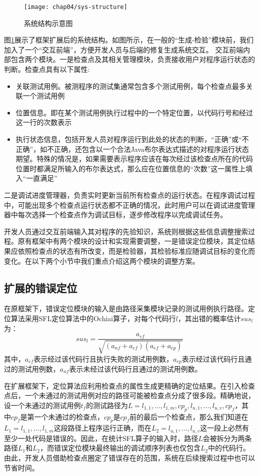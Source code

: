 \begin{figure}
	\centering
	\texttt{[image: chap04/sys-structure]}
	\caption{系统结构示意图}
	\label{fig:sys-structure}
\end{figure}

图\ref{fig:sys-structure}展示了框架扩展后的系统结构。如图所示，在一般的“生成-检验”模块前，我们加入了一个“交互前端”，方便开发人员与后端的修复生成系统交互。
交互前端内部包含两个模块。一是检查点及其相关管理模块，负责接收用户对程序运行状态的判断。检查点具有以下属性:
\begin{itemize}
	\item 关联测试用例。被测程序的测试集通常包含多个测试用例，每个检查点最多关联一个测试用例
	\item 位置信息。即在某个测试用例执行过程中的一个特定位置，以代码行号和经过这一行的次数表示
	\item 执行状态信息，包括开发人员对程序运行到此处的状态的判断，“正确”或“不正确”，如不正确，还包含以一个合法Java布尔表达式描述的对程序运行状态期望。特殊的情况是，如果需要表示程序应该在每次经过该检查点所在的代码位置时都满足所输入的布尔表达式，那么应在位置信息的“次数”这一属性上填入“一直满足”
\end{itemize}

二是调试进度管理器，负责实时更新当前所有检查点的运行状态。在程序调试过程中，可能出现多个检查点运行状态都不正确的情况，此时用户可以在调试进度管理器中每次选择一个检查点作为调试目标，逐步修改程序以完成调试任务。

开发人员通过交互前端输入其对程序的先验知识，系统则根据这些信息调整搜索过程。原有框架中有两个模块的设计和实现需要调整，一是错误定位模块，其定位结果应依照检查点的状态有所改变，而是检验器，其检验标准应随调试目标的变化而变化。在以下两个小节中我们重点介绍这两个模块的调整方案。


\subsection{扩展的错误定位}%

在原框架下，错误定位模块的输入是由路径采集模块记录的测试用例执行路径。定位算法采用SFL定位算法中的Ochiai\cite{Abreu:2006:ESC:1193217.1194368}算子，对每个代码行$l$，其出错的概率估计$sus_l$为：
$$sus_l = \frac{a_{ef}}{\sqrt{(a_{nf} + a_{ef}) (a_{ef} + a_{ep})}}$$
其中，$a_{ef}$表示经过该代码行且执行失败的测试用例数，$a_{ep}$表示经过该代码行且通过的测试用例数，$a_{nf}$表示未经过该代码行且通过的测试用例数。

在扩展框架下，定位算法应利用检查点的属性生成更精确的定位结果。在引入检查点后，一个未通过的测试用例对应的路径可能被检查点分成了很多段。精确地说，设一个未通过的测试用例$t_f$的测试路径为$L = {l_{1,1}, \dots,l_{1,m},cp_p, l_{u,1}, \dots ,l_{u,v}, cp_f}$，其中$cp_f$是第一个未通过的检查点，$cp_p$是$cp_f$前的最后一个检查点，那么我们知道在$L_1 = {l_{1,1}, \dots,l_{1,m}}$这段路径上程序运行正确，而在$L_2 = l_{u,1}, \dots ,l_{u,v}$这一段上必然有至少一处代码是错误的。因此，在统计SFL算子的输入时，路径$L$会被拆分为两条路径$L_1$和$L_2$，而错误定位模块最终输出的调试顺序列表也仅包含$L_2$中的代码行。由此，开发人员借助检查点圈定了错误存在的范围，系统在后续搜索过程中也可以节省时间。

